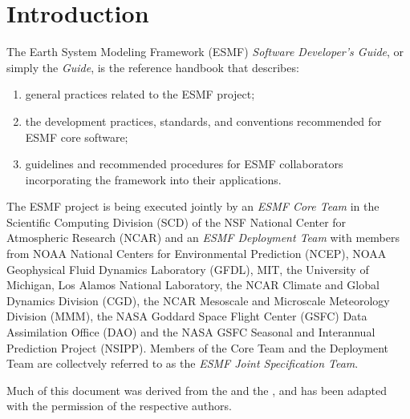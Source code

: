 
\section{Introduction}
\label{sec:intro}

The Earth System Modeling Framework (ESMF) {\it Software Developer's Guide},
or simply the {\it Guide}, 
is the reference handbook that describes:
\begin{enumerate}
\item general practices related to the ESMF project;
\item the development practices, standards, and conventions recommended 
for ESMF core software;  
\item guidelines and recommended procedures for ESMF collaborators 
incorporating the framework into their applications.
\end{enumerate}

The ESMF project is being executed jointly by an {\it ESMF Core Team} in the 
Scientific Computing Division (SCD) of the NSF National Center for Atmospheric 
Research (NCAR) and an {\it ESMF Deployment Team} with members from NOAA
National Centers for Environmental Prediction (NCEP), NOAA Geophysical Fluid
Dynamics Laboratory (GFDL), MIT, the University of Michigan, Los Alamos 
National Laboratory, the NCAR Climate and Global Dynamics Division (CGD), 
the NCAR Mesoscale and Microscale Meteorology Division (MMM), the NASA 
Goddard Space Flight Center (GSFC) Data Assimilation Office (DAO) and the
NASA GSFC Seasonal and Interannual Prediction Project (NSIPP).
Members of the Core Team and the Deployment Team are 
collectvely referred to as the {\it ESMF Joint Specification Team}.

Much of this document was derived from the 
\cite{FMSdevguide} and the 
\cite{CCSMdevguide}, and has been adapted with the permission of the respective authors.


